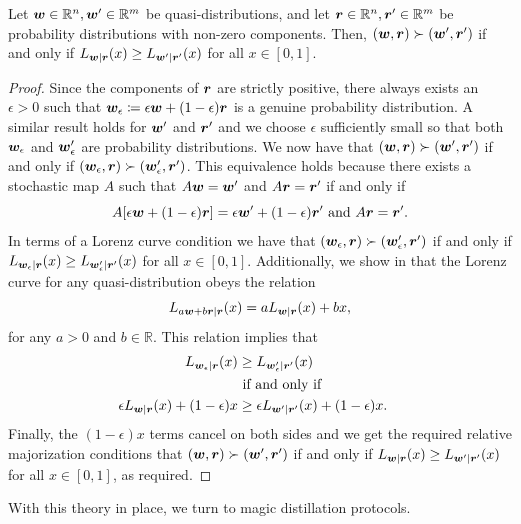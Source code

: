 \documentclass[pra,
aps,
twocolumn,
superscriptaddress,
groupedaddress,
nofootinbib,
reprint
]{revtex4-1}
\begin{document}
\begin{theorem}\label{thm:lcquasi}
	Let $\boldsymbol{w} \in \mathbb{R}^n,\boldsymbol{w}'\in \mathbb{R}^m$ be quasi-distributions, and let $\boldsymbol{r} \in \mathbb{R}^n, \boldsymbol{r}' \in \mathbb{R}^m$ be probability distributions with non-zero components. Then, $(\boldsymbol{w}, \boldsymbol{r}) \succ (\boldsymbol{w}', \boldsymbol{r}')$ if and only if $L_{\boldsymbol{w}|\boldsymbol{r}}(x) \ge L_{\boldsymbol{w}' |\boldsymbol{r}'}(x)$ for all $x \in [0,1]$.
\end{theorem}
\begin{proof}
	Since the components of $\boldsymbol{r}$ are strictly positive, there always exists an $\epsilon >0$ such that $\boldsymbol{w}_\epsilon \coloneqq \epsilon \boldsymbol{w} + (1-\epsilon) \boldsymbol{r}$ is a genuine probability distribution. A similar result holds for $\boldsymbol{w}'$ and $\boldsymbol{r}'$ and we choose $\epsilon$ sufficiently small so that both $\boldsymbol{w}_\epsilon$ and $\boldsymbol{w}_\epsilon'$ are probability distributions. We now have that $(\boldsymbol{w}, \boldsymbol{r}) \succ (\boldsymbol{w}', \boldsymbol{r}')$ if and only if $(\boldsymbol{w}_\epsilon , \boldsymbol{r}) \succ (\boldsymbol{w}_\epsilon', \boldsymbol{r}')$. This equivalence holds because there exists a stochastic map $A$ such that $A \boldsymbol{w} = \boldsymbol{w}'$ and $A \boldsymbol{r} = \boldsymbol{r}'$ if and only if 
\begin{equation}
A[\epsilon \boldsymbol{w} + (1-\epsilon) \boldsymbol{r}] = \epsilon \boldsymbol{w}' + (1-\epsilon) \boldsymbol{r}'\mbox{ and } A\boldsymbol{r} = \boldsymbol{r}'.
\end{equation}
In terms of a Lorenz curve condition we have that $(\boldsymbol{w}_\epsilon , \boldsymbol{r}) \succ (\boldsymbol{w}_\epsilon', \boldsymbol{r}')$ if and only if $L_{\boldsymbol{w}_\epsilon |\boldsymbol{r}} (x) \ge L_{\boldsymbol{w}'_\epsilon |\boldsymbol{r}'} (x)$ for all $x \in [0,1]$. 
Additionally, we show in  that the Lorenz curve for any quasi-distribution obeys the relation
\begin{equation}
L_{a \boldsymbol{w} + b \boldsymbol{r} | \boldsymbol{r}} (x) = a L_{\boldsymbol{w}|\boldsymbol{r}} (x) + bx,
\end{equation}
for any $a >0$ and $b \in \mathbb{R}$. This relation implies that
\begin{align*}
L_{\boldsymbol{w}_\epsilon |\boldsymbol{r}} (x) &\ge L_{\boldsymbol{w}'_\epsilon |\boldsymbol{r}'} (x) \nonumber \\ 
&\mbox{ if and only if }& \\
\epsilon L_{\boldsymbol{w} |\boldsymbol{r}} (x) + (1-\epsilon) x &\ge \epsilon L_{\boldsymbol{w}' |\boldsymbol{r}'} (x) + (1-\epsilon) x.
\end{align*}
Finally, the $(1-\epsilon)x$ terms cancel on both sides and we get the required relative majorization conditions that $(\boldsymbol{w}, \boldsymbol{r}) \succ (\boldsymbol{w}', \boldsymbol{r}')$ if and only if $L_{\boldsymbol{w} | \boldsymbol{r}} (x) \ge L_{\boldsymbol{w}' | \boldsymbol{r}'}(x)$ for all $x \in [0,1]$, as required.
\end{proof}

With this theory in place, we turn to magic distillation protocols.
\end{document}

